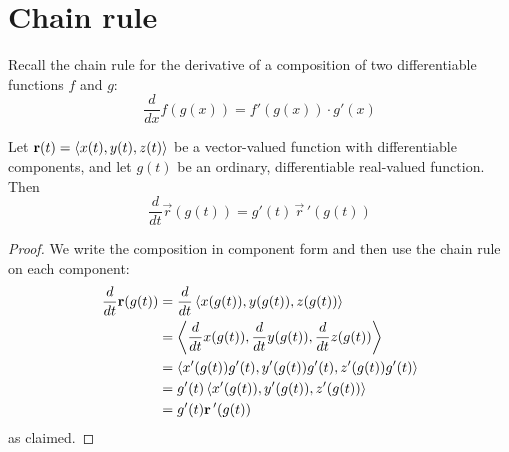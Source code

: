 \documentclass[handout]{ximera}
\begin{document}
\section{Chain rule}
Recall the chain rule for the derivative of a composition of two differentiable functions $f$ and $g$:
\[
\frac{d}{dx} f(g(x)) = f'(g(x)) \cdot g'(x)
\]

\begin{proposition}
Let $\mathbf r(t) = \left\langle x(t), y(t),z(t)\right\rangle$ be a vector-valued function with differentiable components, and let $g(t)$ be an ordinary, differentiable real-valued function.
Then
\[
\frac{d}{dt}\vec r(g(t)) = g'(t)\,\vec r\,'(g(t))
\]
\end{proposition}
\begin{proof}
We write the composition in component form and then use the chain rule on each component:
\begin{align*}
\frac{d}{dt} \mathbf r(g(t)) &= \frac{d}{dt} \left\langle x(g(t)), y(g(t)),z(g(t))\right\rangle\\
&= \left\langle \frac{d}{dt} x(g(t)), \frac{d}{dt} y(g(t)), \frac{d}{dt} z(g(t))\right\rangle\\
&= \left\langle x'(g(t)) g'(t), y'(g(t)) g'(t), z'(g(t)) g'(t)\right\rangle\\
&= g'(t)\left\langle x'(g(t)), y'(g(t)), z'(g(t))\right\rangle\\
&= g'(t) \mathbf r\,'(g(t))
\end{align*}
as claimed.
\end{proof}
\end{document}
